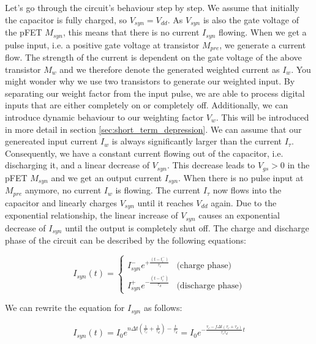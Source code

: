 Let's go through the circuit's behaviour step by step. We assume that initially the capacitor is fully charged, so $V_{syn} = V_{dd}$. As $V_{syn}$ is also the gate voltage of the pFET $M_{syn}$, this means that there is no current $I_{syn}$ flowing. When we get a pulse input, i.e. a positive gate voltage at transistor $M_{pre}$, we generate a current flow. The strength of the current is dependent on the gate voltage of the above transistor $M_w$ and we therefore denote the generated weighted current as $I_w$. You might wonder why we use two transistors to generate our weighted input. By separating our weight factor from the input pulse, we are able to process digital inputs that are either completely on or completely off. Additionally, we can introduce dynamic behaviour to our weighting factor $V_w$. This will be introduced in more detail in section \ref{sec:short_term_depression}. We can assume that our genereated input current $I_w$ is always significantly larger than the current $I_{\tau}$. Consequently, we have a constant current flowing out of the capacitor, i.e. discharging it, and a linear decrease of $V_{syn}$. This decrease leads to $V_{gs} > 0$ in the pFET $M_{syn}$ and we get an output current $I_{syn}$. When there is no pulse input at $M_{pre}$ anymore, no current $I_w$ is flowing. The current $I_{\tau}$ now flows into the capacitor and linearly charges $V_{syn}$ until it reaches $V_{dd}$ again. Due to the exponential relationship, the linear increase of $V_{syn}$ causes an exponential decrease of $I_{syn}$ until the output is completely shut off. The charge and discharge phase of the circuit can be described by the following equations:

\begin{equation}
    I_{syn}(t) = 
    \begin{cases}
      I_{syn}^- e^{+\frac{(t-t_i^-)}{\tau_c}}& \text{(charge phase)}\\
      I_{syn}^+ e^{-\frac{(t-t_i^+)}{\tau_d}}& \text{(discharge phase)}
    \end{cases}       
\end{equation}

We can rewrite the equation for $I_{syn}$ as follows:

\begin{equation}
    I_{syn}(t) = I_0 e^{n\Delta t (\frac{1}{\tau_c}+\frac{1}{\tau_d})-\frac{t}{\tau_d}} = I_0 e^{-\frac{\tau_c -f\Delta t (\tau_c + \tau_d)}{\tau_c \tau_d} t}
\end{equation}

